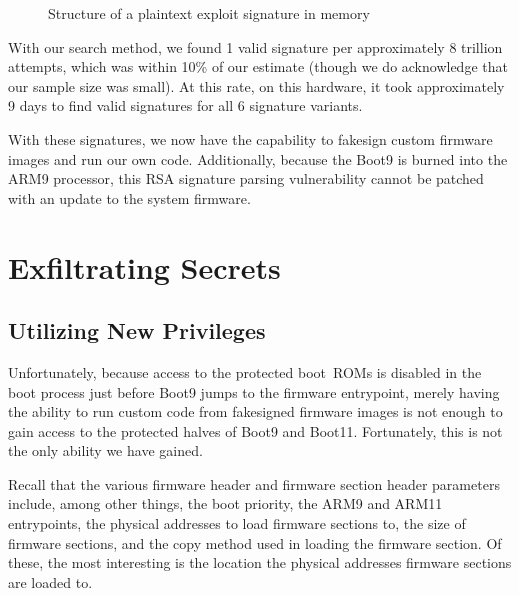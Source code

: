 \documentclass[journal]{IEEEtran}
\begin{document}
\begin{figure}[h]
  \begin{minipage}{.40\linewidth}
  \end{minipage}%
  \caption{Structure of a plaintext exploit signature in memory}
\end{figure}

With our search method, we found 1 valid signature per approximately 8 trillion
attempts, which was within 10\% of our estimate (though we do acknowledge that
our sample size was small). At this rate, on this hardware, it took
approximately 9 days to find valid signatures for all 6 signature variants.

With these signatures, we now have the capability to fakesign custom firmware
images and run our own code. Additionally, because the Boot9 is burned into the
ARM9 processor, this RSA signature parsing vulnerability cannot be patched with
an update to the system firmware.

\section{Exfiltrating Secrets}

\subsection{Utilizing New Privileges}

Unfortunately, because access to the protected boot~ROMs is disabled in the boot
process just before Boot9 jumps to the firmware entrypoint, merely having the
ability to run custom code from fakesigned firmware images is not enough to gain
access to the protected halves of Boot9 and Boot11. Fortunately, this is not the
only ability we have gained. 

Recall that the various firmware header and firmware section header parameters
include, among other things, the boot priority, the ARM9 and ARM11 entrypoints,
the physical addresses to load firmware sections to, the size of firmware
sections, and the copy method used in loading the firmware section. Of these,
the most interesting is the location the physical addresses firmware sections
are loaded to.
\end{document}
